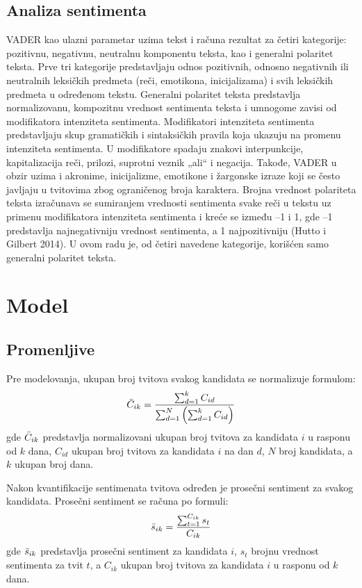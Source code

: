 \subsection{Analiza sentimenta}

VADER kao ulazni parametar uzima tekst i računa rezultat za četiri kategorije: pozitivnu, negativnu, neutralnu komponentu teksta, kao i generalni polaritet teksta. Prve tri kategorije predstavljaju odnos pozitivnih, odnosno negativnih ili neutralnih leksičkih predmeta (reči, emotikona, inicijalizama) i svih leksičkih predmeta u određenom tekstu. Generalni polaritet teksta predstavlja normalizovanu, kompozitnu vrednost sentimenta teksta i umnogome zavisi od modifikatora intenziteta sentimenta. Modifikatori intenziteta sentimenta predstavljaju skup gramatičkih i sintaksičkih pravila koja ukazuju na promenu intenziteta sentimenta. U modifikatore spadaju znakovi interpunkcije, kapitalizacija reči, prilozi, suprotni veznik „ali“ i negacija. Takođe, VADER u obzir uzima i akronime, inicijalizme, emotikone i žargonske izraze koji se često javljaju u tvitovima zbog ograničenog broja karaktera. Brojna vrednost polariteta teksta izračunava se sumiranjem vrednosti sentimenta svake reči u tekstu uz primenu modifikatora intenziteta sentimenta i kreće se između –1 i 1, gde –1 predstavlja najnegativniju vrednost sentimenta, a 1 najpozitivniju (Hutto i Gilbert 2014). U ovom radu je, od četiri navedene kategorije, korišćen samo generalni polaritet teksta.

\section{Model}

\subsection{Promenljive}

Pre modelovanja, ukupan broj tvitova svakog kandidata se normalizuje formulom:
\begin{equation*}
    \Bar{C}_{ik}=\frac{\sum^{k}_{d=1} C_{id}}{\sum^N_{d=1}\left(\sum^k_{d=1}C_{id}\right)}
\end{equation*}
gde $\Bar{C}_{ik}$ predstavlja normalizovani ukupan broj tvitova za kandidata $i$ u rasponu od $k$ dana, $C_{id}$ ukupan broj tvitova za kandidata $i$ na dan $d$, $N$ broj kandidata, a $k$ ukupan broj dana.

Nakon kvantifikacije sentimenata tvitova određen je prosečni sentiment za svakog kandidata. Prosečni sentiment se računa po formuli:
\begin{equation*}
    \Bar{s}_{ik}=\frac{\sum^{C_{ik}}_{t=1} s_t}{C_{ik}}
\end{equation*}
gde $\Bar{s}_{ik}$ predstavlja prosečni sentiment za kandidata $i$, $s_t$ brojnu vrednost sentimenta za tvit $t$, a $C_{ik}$ ukupan broj tvitova za kandidata $i$ u rasponu od $k$ dana.

